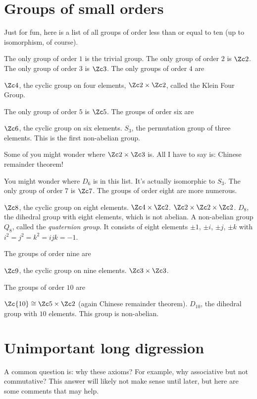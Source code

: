 \section{Groups of small orders}
Just for fun, here is a list of all groups of order less than or equal to ten
(up to isomorphism, of course).
\begin{enumerate}
	\ii The only group of order $1$ is the trivial group.
	\ii The only group of order $2$ is $\Zc 2$.
	\ii The only group of order $3$ is $\Zc 3$.
	\ii The only groups of order $4$ are
	\begin{itemize}
		\ii $\Zc 4$, the cyclic group on four elements,
		\ii $\Zc 2 \times \Zc 2$, called the Klein Four Group.
	\end{itemize}
	\ii The only group of order $5$ is $\Zc 5$.
	\ii The groups of order six are
	\begin{itemize}
		\ii $\Zc 6$, the cyclic group on six elements.
		\ii $S_3$, the permutation group of three elements.
		This is the first non-abelian group.
	\end{itemize}
	Some of you might wonder where $\Zc 2 \times \Zc 3$ is.
	All I have to say is: Chinese remainder theorem!

	You might wonder where $D_6$ is in this list.
	It's actually isomorphic to $S_3$.
	\ii The only group of order $7$ is $\Zc 7$.
	\ii The groups of order eight are more numerous.
	\begin{itemize}
		\ii $\Zc 8$, the cyclic group on eight elements.
		\ii $\Zc 4 \times \Zc 2$.
		\ii $\Zc 2 \times \Zc 2 \times \Zc 2$.
		\ii $D_8$, the dihedral group with eight elements, which is not abelian.
		\ii A non-abelian group $Q_8$, called the \emph{quaternion group}.
		It consists of eight elements $\pm 1$, $\pm i$, $\pm j$, $\pm k$
		with $i^2=j^2=k^2=ijk=-1$.
	\end{itemize}
	\ii The groups of order nine are
	\begin{itemize}
		\ii $\Zc 9$, the cyclic group on nine elements.
		\ii $\Zc 3 \times \Zc 3$.
	\end{itemize}
	\ii The groups of order $10$ are
	\begin{itemize}
		\ii $\Zc{10} \cong \Zc5 \times \Zc2$ (again Chinese remainder theorem).
		\ii $D_{10}$, the dihedral group with $10$ elements.
		This group is non-abelian.
	\end{itemize}
\end{enumerate}

\section{Unimportant long digression}
A common question is: why these axioms?
For example, why associative but not commutative?
This answer will likely not make sense until later,
but here are some comments that may help.

